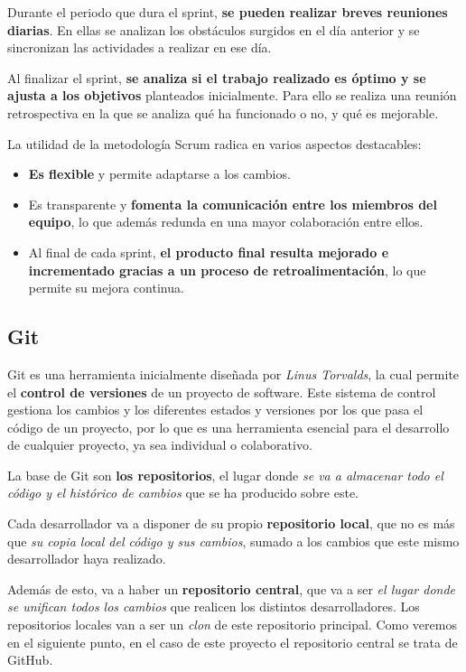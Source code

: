 Durante el periodo que dura el sprint, \textbf{se pueden realizar breves reuniones diarias}. En ellas se analizan los obstáculos surgidos en el día anterior y se sincronizan las actividades a realizar en ese día.

Al finalizar el sprint, \textbf{se analiza si el trabajo realizado es óptimo y se ajusta a los objetivos} planteados inicialmente. Para ello se realiza una reunión retrospectiva en la que se analiza qué ha funcionado o no, y qué es mejorable.

La utilidad de la metodología Scrum radica en varios aspectos destacables:
\begin{itemize}
  \item \textbf{Es flexible} y permite adaptarse a los cambios.
  \item Es transparente y \textbf{fomenta la comunicación entre los miembros del equipo}, lo que además redunda en una mayor colaboración entre ellos.
  \item Al final de cada sprint, \textbf{el producto final resulta mejorado e incrementado gracias a un proceso de retroalimentación}, lo que permite su mejora continua.
\end{itemize}

\subsection{Git}

Git es una herramienta inicialmente diseñada por \textit{Linus Torvalds}, la cual permite el \textbf{control de versiones} de un proyecto de software. Este sistema de control gestiona los cambios y los diferentes estados y versiones por los que pasa el código de un proyecto, por lo que es una herramienta esencial para el desarrollo de cualquier proyecto, ya sea individual o colaborativo. \cite{atlassian:git}

La base de Git son \textbf{los repositorios}, el lugar donde \textit{se va a almacenar todo el código y el histórico de cambios} que se ha producido sobre este. 

Cada desarrollador va a disponer de su propio \textbf{repositorio local}, que no es más que \textit{su copia local del código y sus cambios}, sumado a los cambios que este mismo desarrollador haya realizado. 

Además de esto, va a haber un \textbf{repositorio central}, que va a ser \textit{el lugar donde se unifican todos los cambios} que realicen los distintos desarrolladores. Los repositorios locales van a ser un \textit{clon} de este repositorio principal. Como veremos en el siguiente punto, en el caso de este proyecto el repositorio central se trata de GitHub.

